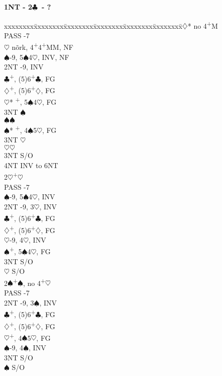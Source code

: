 \documentclass[10pt]{article}
\renewcommand{\c}{$\clubsuit$}
\renewcommand{\d}{$\diamondsuit$}
\newcommand{\h}{$\heartsuit$}
\newcommand{\s}{$\spadesuit$}
\newcommand{\p}{\textsuperscript{+}}
\newcommand{\m}{\textsuperscript{\textminus}}
\newenvironment{bidtable}[1][]
{\textbf{#1}
  \begin{adjustwidth}{1em}{}
    \addvspace{2pt}
    \begin{tabbing}
      xxxxxxxx\=xxxxxxxx\=xxxxxxxx\=xxxxxxxx\=xxxxxxxx\=xxxxxxxx\=\kill}
{\end{tabbing}\end{adjustwidth}\bigskip}%
\begin{document}
\begin{multicols*}{2}
\begin{bidtable}[1NT - 2\c\ - ?]
2\d* \> no 4\p M                      \\
     \> PASS -7                   \\
     \h  \> nõrk, 4\p 4\p MM, NF  \\
     \s  {}-9, 5\s 4\h, INV, NF \\
     \> 2NT  -9, INV              \\
     \c  {}\p, (5)6\p\c, FG    \\
     \d  {}\p, (5)6\p\d, FG    \\
     \h* {}\p, 5\s 4\h, FG     \\
     \>      \> 3NT \s            \\
     \>      \s {}\s            \\
     \s* {}\p, 4\s 5\h, FG     \\
     \>      \> 3NT \h            \\
     \>      \h {}\h            \\
     \> 3NT  \> S/O                   \\
     \> 4NT  \> INV to 6NT            \\
2\h  {}\p\h                         \\
     \> PASS -7                   \\
     \s  {}-9, 5\s 4\h, INV     \\
     \> 2NT  -9, 3\m\h, INV       \\
     \c  {}\p, (5)6\p\c, FG    \\
     \d  {}\p, (5)6\p\d, FG    \\
     \h  {}-9, 4\h, INV         \\
     \s  {}\p, 5\s 4\h, FG     \\
     \> 3NT  \> S/O                   \\
     \h  \> S/O                   \\
2\s  {}\p\s, no 4\p\h               \\
     \> PASS -7                   \\
     \> 2NT  -9, 3\m\s, INV       \\
     \c  {}\p, (5)6\p\c, FG    \\
     \d  {}\p, (5)6\p\d, FG    \\
     \h  {}\p, 4\s 5\h, FG     \\
     \s  {}-9, 4\s, INV         \\
     \> 3NT  \> S/O                   \\
     \s  \> S/O
\end{bidtable}


\end{multicols*}
\end{document}
